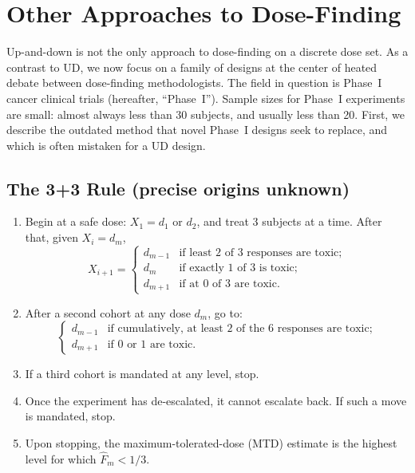 

\section{Other Approaches to Dose-Finding}\label{sec:other}

Up-and-down is not the only approach to dose-finding on a discrete dose set. As a contrast to UD, we now focus on a family of designs at the center of heated debate between dose-finding methodologists. The field in question is Phase~I cancer clinical trials (hereafter, ``Phase~I''). Sample sizes for Phase~I experiments are small: almost always less than 30 subjects, and usually less than 20. First, we describe the outdated method that novel Phase~I designs seek to replace, and which is often \citep{Rogat:etal:oped:2007,Zack:stag:2009} mistaken for a UD design.

\subsection{The 3+3 Rule (precise origins unknown)}

\begin{enumerate}
\item Begin at a safe dose: $X_1=d_1$ or $d_2$, and treat 3 subjects at a time. After that, given $X_i=d_m$,
\begin{equation*}
X_{i+1}=
\begin{cases}
d_{m-1} &\textrm{if least $2$ of $3$ responses are toxic;} \\
d_m &\textrm{if exactly $1$ of $3$ is toxic;}\\
d_{m+1} &\textrm{if at $0$ of $3$ are toxic.}
\end{cases}
\end{equation*}
\item After a second cohort at any dose $d_m$, go to:
\begin{equation*}
\begin{cases}
 d_{m-1} &\textrm{if cumulatively, at least $2$ of the $6$ responses are toxic;} \\
 d_{m+1} &\textrm{if $0$ or $1$ are toxic.}
\end{cases}
\end{equation*}
\item If a third cohort is mandated at any level, stop.
\item Once the experiment has de-escalated, it cannot escalate back. If such a move is mandated, stop.
\item Upon stopping, the maximum-tolerated-dose (MTD) estimate is the highest level for which $\hat{F}_m<1/3$.
\end{enumerate}


